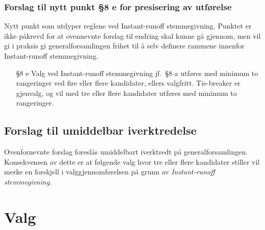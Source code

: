 \documentclass[10pt,norsk,a4paper]{article}
\begin{document}
\subsubsection{Forslag til nytt punkt §8 e for presisering av utførelse}

Nytt punkt som utdyper reglene ved Instant-runoff stemmegivning. Punktet er ikke påkrevd for at ovennevnte forslag til endring skal kunne gå gjennom, men vil gi i praksis gi generalforsamlingen frihet til å selv definere rammene innenfor Instant-runoff stemmegivning.

\begin{enumerate}
	\item[§8 e] Valg ved Instant-runoff stemmegivning jf.~§8 a utføres med minimum to rangeringer ved fire eller flere kandidater, ellers valgfritt. Tie-breaker er gjenvalg, og vil med tre eller flere kandidater utføres med minimum to rangeringer.
\end{enumerate}


\subsection{Forslag til umiddelbar iverktredelse}

Ovenfornevnte forslag foreslås umiddelbart iverktredt på generalforsamlingen.
Konsekvensen av dette er at følgende valg hvor tre eller flere kandidater stiller vil merke en forskjell i valggjennomførelsen på grunn av \textit{Instant-runoff stemmegivning}.



\section{Valg}
\end{document}
